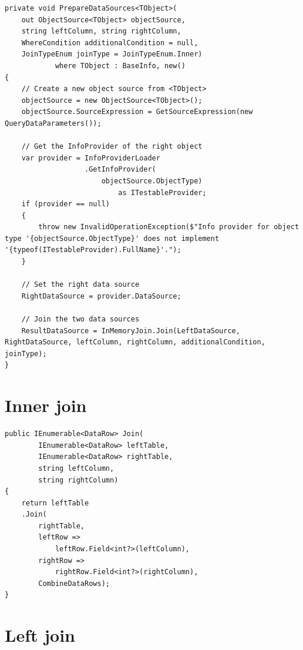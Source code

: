 \documentclass[
  print,
  table,
  nolof,
  nolot,
  nocover,
  oneside
]{fithesis3}
\begin{document}
\begin{lstlisting}
private void PrepareDataSources<TObject>(
    out ObjectSource<TObject> objectSource,
    string leftColumn, string rightColumn,
    WhereCondition additionalCondition = null,
    JoinTypeEnum joinType = JoinTypeEnum.Inner)
            where TObject : BaseInfo, new()
{
    // Create a new object source from <TObject>
    objectSource = new ObjectSource<TObject>();
    objectSource.SourceExpression = GetSourceExpression(new QueryDataParameters());

    // Get the InfoProvider of the right object
    var provider = InfoProviderLoader
                   .GetInfoProvider(
                       objectSource.ObjectType)
                           as ITestableProvider;
    if (provider == null)
    {
        throw new InvalidOperationException($"Info provider for object type '{objectSource.ObjectType}' does not implement '{typeof(ITestableProvider).FullName}'.");
    }

    // Set the right data source
    RightDataSource = provider.DataSource;

    // Join the two data sources
    ResultDataSource = InMemoryJoin.Join(LeftDataSource, RightDataSource, leftColumn, rightColumn, additionalCondition, joinType);
}
\end{lstlisting}
\newpage


\section{Inner join}
\label{innerjoin_method}

\begin{lstlisting}
public IEnumerable<DataRow> Join(
        IEnumerable<DataRow> leftTable,
        IEnumerable<DataRow> rightTable,
        string leftColumn,
        string rightColumn)
{
    return leftTable
    .Join(
        rightTable,
        leftRow =>
            leftRow.Field<int?>(leftColumn),
        rightRow =>
            rightRow.Field<int?>(rightColumn),
        CombineDataRows);
}
\end{lstlisting}
\newpage


\section{Left join}
\label{leftjoin_method}
\end{document}
